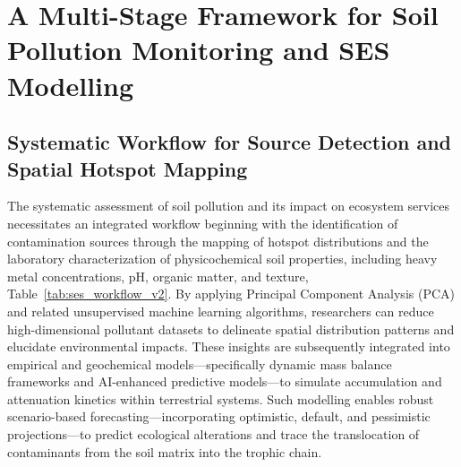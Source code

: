 \documentclass[preprint,12pt]{elsarticle}            %
\begin{document}
\section{A Multi-Stage Framework for Soil Pollution Monitoring and SES
    Modelling}\label{sec4}

\subsection{Systematic Workflow for Source Detection and Spatial Hotspot
    Mapping}\label{sec4.1}

The systematic assessment of soil pollution and its impact on ecosystem
services necessitates an integrated workflow beginning with the identification
of contamination sources through the mapping of hotspot distributions and the
laboratory characterization of physicochemical soil properties, including
heavy metal concentrations, pH, organic matter, and texture,
Table~\ref{tab:ses_workflow_v2}. By applying Principal Component Analysis
(PCA) and related unsupervised machine learning algorithms, researchers can
reduce high-dimensional pollutant datasets to delineate spatial distribution
patterns and elucidate environmental impacts. These insights are subsequently
integrated into empirical and geochemical models---specifically dynamic mass
balance frameworks and AI-enhanced predictive models---to simulate
accumulation and attenuation kinetics within terrestrial systems. Such
modelling enables robust scenario-based forecasting---incorporating optimistic,
default, and pessimistic projections---to predict ecological alterations and
trace the translocation of contaminants from the soil matrix into the trophic
chain.
\end{document}
